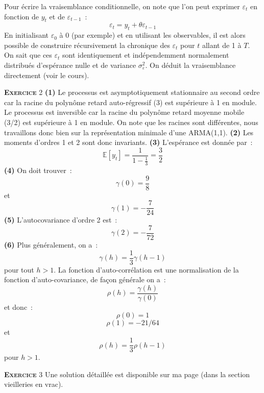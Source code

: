 \documentclass[10pt,a4paper,notitlepage,twocolumn]{article}
\newcommand{\exercice}[1]{\textsc{\textbf{Exercice}} #1}
\begin{document}
Pour écrire la vraisemblance conditionnelle, on note que l'on peut
exprimer $\varepsilon_t$ en fonction de $y_t$ et de
$\varepsilon_{t-1}$ :
\[
\varepsilon_t = y_t + \theta \varepsilon_{t-1}
\]
En initialisant $\varepsilon_0$ à 0 (par exemple) et en utilisant les
observables, il est alors possible de construire récursivement la
chronique des $\varepsilon_t$ pour $t$ allant de 1 à $T$. On sait que
ces $\varepsilon_t$ sont identiquement et indépendemment normalement
distribués d'espérance nulle et de variance
$\sigma_{\varepsilon}^2$. On déduit la vraisemblance directement (voir
le cours).

\bigskip
\bigskip


\exercice{2} \textbf{(1)} Le processus est asymptotiquement
stationnaire au second ordre car la racine du polynôme retard
auto-régressif (3) est supérieure à 1 en module. Le processus est
inversible car la racine du polynôme retard moyenne mobile (3/2) est
supérieure à 1 en module. On note que les racines sont différentes,
nous travaillons donc bien sur la représentation minimale d'une
ARMA(1,1). \textbf{(2)} Les moments d'ordres 1 et 2 sont donc
invariants. \textbf{(3)} L'espérance est donnée par :
\[
\mathbb E [y_t] = \frac{1}{1-\frac{1}{3}} = \frac{3}{2} 
\]
\textbf{(4)} On doit trouver :
\[
\gamma(0) = \frac{9}{8} 
\]
et
\[
\gamma(1) = -\frac{7}{24}
\]
\textbf{(5)} L'autocovariance d'ordre 2 est :
\[
\gamma(2) = -\frac{7}{72}
\]
\textbf{(6)} Plus généralement, on a :
\[
\gamma(h) = \frac{1}{3}\gamma(h-1)
\]
pour tout $h>1$. La fonction d'auto-corrélation est une normalisation de la fonction d'auto-covariance, de façon générale on a :
\[
\rho(h) = \frac{\gamma(h)}{\gamma(0)}
\]
et donc :
\[
\rho(0) = 1
\]
\[
\rho(1) = -21/64
\]
et
\[
\rho(h) = \frac{1}{3}\rho(h-1)
\]
pour $h>1$.

\bigskip
\bigskip

\exercice{3} Une solution détaillée est disponible sur ma page (dans la section vieilleries en vrac).
\end{document}
